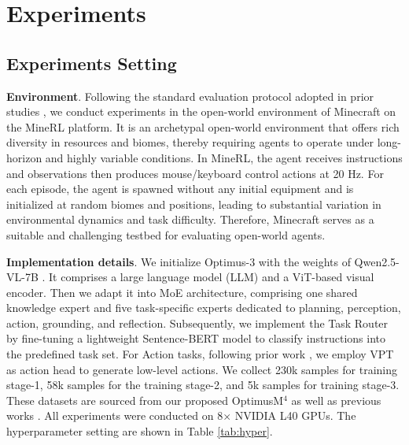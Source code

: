 


\section{Experiments}


\subsection{Experiments Setting}

\noindent\textbf{Environment}. Following the standard evaluation protocol adopted in prior studies \cite{lifshitz2024steve,wang2023describe,wang2023jarvis,qin2023mp5,li2024optimus}, we conduct experiments in the open-world environment of Minecraft on the MineRL \cite{guss2019minerl} platform. It is an archetypal open-world environment that offers rich diversity in resources and biomes, thereby requiring agents to operate under long-horizon and highly variable conditions. In MineRL, the agent receives instructions and observations then produces mouse/keyboard control actions at 20 Hz. For each episode, the agent is spawned without any initial equipment and is initialized at random biomes and positions, leading to substantial variation in environmental dynamics and task difficulty. Therefore, Minecraft serves as a suitable and challenging testbed for evaluating open-world agents.


\noindent\textbf{Implementation details}. We initialize Optimus-3 with the weights of Qwen2.5-VL-7B \cite{bai2025qwen2}. It comprises a large language model (LLM) and a ViT-based \cite{dosovitskiy2020vit} visual encoder. Then we adapt it into MoE architecture, comprising one shared knowledge expert and five task-specific experts dedicated to planning, perception, action, grounding, and reflection. Subsequently, we implement the Task Router by fine-tuning a lightweight Sentence-BERT \cite{reimers2019sentence} model to classify instructions into the predefined task set. For Action tasks, following prior work \cite{li2025optimus}, we employ  VPT \cite{vpt} as action head to generate low-level actions. We collect 230k samples for training stage-1, 58k samples for the training stage-2, and 5k samples for training stage-3. These datasets are sourced from our proposed OptimusM$^4$ as well as previous works \cite{vpt,li2025optimus,qin2023mp5}. All experiments were conducted on 8$\times$ NVIDIA L40 GPUs. The hyperparameter setting are shown in Table \ref{tab:hyper}.




